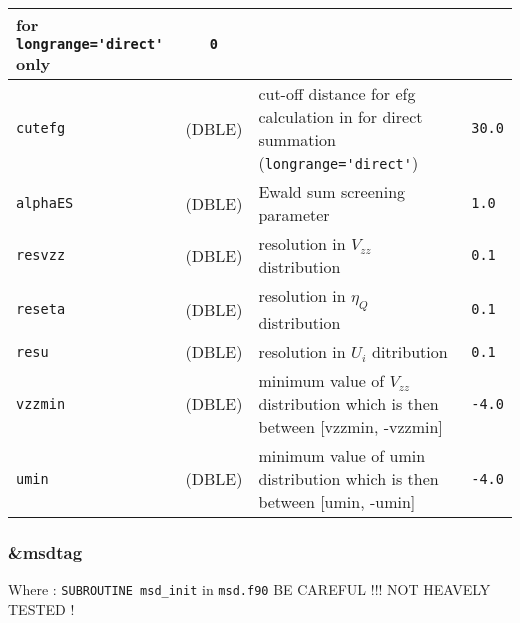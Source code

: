 \documentclass[a4paper]{article}
\begin{document}
\begin{longtable}{l|c|m{8cm}|m{2cm}}
                                              for \verb?longrange='direct'?  only \newline                                         & \verb?0? \\
\hline
\rule[-0.75cm]{0cm}{1.5cm}
\verb?cutefg?          & (DBLE)             & cut-off distance for efg calculation in for direct summation 
                                              (\verb?longrange='direct'?) & \verb?30.0? \\
\hline
\rule[-0.75cm]{0cm}{1.5cm}
\verb?alphaES?         & (DBLE)             & Ewald sum screening parameter                                                        & \verb?1.0? \\
\hline
\rule[-0.75cm]{0cm}{1.5cm}
\verb?resvzz?          & (DBLE)             & resolution in $V_{zz}$ distribution                                                       & \verb?0.1? \\
\hline
\rule[-0.75cm]{0cm}{1.5cm}
\verb?reseta?          & (DBLE)             & resolution in $\eta_Q$ distribution                                                       & \verb?0.1? \\
\hline
\rule[-0.75cm]{0cm}{1.5cm}
\verb?resu?            & (DBLE)             & resolution in $U_i$ ditribution                                                         & \verb?0.1? \\
\hline
\rule[-0.75cm]{0cm}{1.5cm}
\verb?vzzmin?          & (DBLE)             & minimum value of $V_{zz}$ distribution which is then between [vzzmin, -vzzmin]            & \verb?-4.0? \\ 
\hline
\rule[-0.75cm]{0cm}{1.5cm}
\verb?umin?            & (DBLE)             & minimum value of umin distribution which is then between [umin, -umin]               & \verb?-4.0? \\
\hline
\hline
\end{longtable}


\subsubsection{\&msdtag}

Where : \verb?SUBROUTINE msd_init? in \verb?msd.f90?
BE CAREFUL !!! NOT HEAVELY TESTED !
\newline
\end{document}
